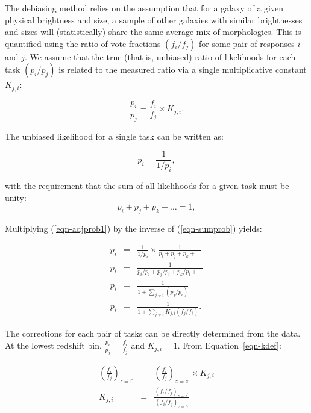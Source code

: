 \documentclass[useAMS,usenatbib]{mn2e}
\providecommand{\DIFaddtex}[1]{{\protect\color{blue}\uwave{#1}}} %
\providecommand{\DIFaddbegin}{} %
\providecommand{\DIFaddend}{} %
\providecommand{\DIFadd}[1]{\texorpdfstring{\DIFaddtex{#1}}{#1}} %
\begin{document}
The debiasing method relies on the assumption that for a galaxy of a given physical brightness and size, a sample of other galaxies with similar brightnesses and sizes will (statistically) share the same average mix of morphologies. This is quantified using the ratio of vote fractions $(f_i/f_j)$ for some pair of responses $i$ and $j$. We assume that the true (that is, unbiased) ratio of likelihoods for each task $(p_i/p_j)$ is related to the measured ratio via a single multiplicative constant $K_{j,i}$:

\begin{equation}
\frac{p_i}{p_j} = \frac{f_i}{f_j}\times K_{j,i}.
\label{eqn-kdef}
\end{equation}

\noindent The unbiased likelihood for a single task can \DIFaddbegin \DIFadd{trivially }\DIFaddend be written as:

\begin{equation}
p_i = \frac{1}{1/p_i},
\label{eqn-adjprob1}
\end{equation}

\noindent with the requirement that the sum of all likelihoods for a given task must be unity:
\begin{equation}
p_i + p_j + p_k + \dots = 1,
\label{eqn-sumprob}
\end{equation}

\noindent Multiplying (\ref{eqn-adjprob1}) by the inverse of (\ref{eqn-sumprob}) yields:

\begin{eqnarray}
p_i &=& \frac{1}{1/p_i} \times \frac{1}{p_i + p_j + p_k + \dots} \\
p_i &=& \frac{1}{p_i/p_i + p_j/p_i + p_k/p_i + \dots} \\
p_i &=& \frac{1}{1 + \sum\limits_{j\ne i}{(p_j/p_i)}} \\
p_i &=& \frac{1}{1 + \sum\limits_{j\ne i}{K_{j,i} (f_j/f_i)}}.
\label{eqnarray-adjprob2}
\end{eqnarray}

The corrections for each pair of tasks can be directly determined from the data. At the lowest redshift bin, $\frac{p_i}{p_j} = \frac{f_i}{f_j}$ and $K_{j,i}=1$. From Equation~\ref{eqn-kdef}:

\begin{eqnarray}
\left(\frac{f_i}{f_j}\right)_{z=0} &=& \left(\frac{f_i}{f_j}\right)_{z=z^\prime}\times K_{j,i} \\
K_{j,i} &=& \frac{\left(f_i/f_j\right)_{z=z^\prime} }{ \left(f_i/f_j\right)_{z=0}}
\label{eqnarray-adjprob3}
\end{eqnarray}
\end{document}
